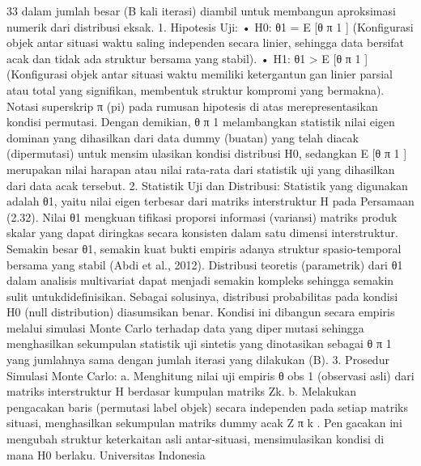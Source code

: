 33
dalam jumlah besar (B kali iterasi) diambil untuk membangun aproksimasi numerik dari
distribusi eksak.
1. Hipotesis Uji:
• H0: θ1 = E [θ
π
1
] (Konfigurasi objek antar situasi waktu saling independen
secara linier, sehingga data bersifat acak dan tidak ada struktur bersama yang
stabil).
• H1: θ1 > E [θ
π
1
] (Konfigurasi objek antar situasi waktu memiliki ketergantungan linier parsial atau total yang signifikan, membentuk struktur kompromi
yang bermakna).
Notasi superskrip π (pi) pada rumusan hipotesis di atas merepresentasikan kondisi
permutasi. Dengan demikian, θ
π
1 melambangkan statistik nilai eigen dominan yang
dihasilkan dari data dummy (buatan) yang telah diacak (dipermutasi) untuk mensimulasikan kondisi distribusi H0, sedangkan E [θ
π
1
] merupakan nilai harapan atau nilai
rata-rata dari statistik uji yang dihasilkan dari data acak tersebut.
2. Statistik Uji dan Distribusi: Statistik yang digunakan adalah θ1, yaitu nilai eigen
terbesar dari matriks interstruktur H pada Persamaan (2.32). Nilai θ1 mengkuantifikasi proporsi informasi (variansi) matriks produk skalar yang dapat diringkas
secara konsisten dalam satu dimensi interstruktur. Semakin besar θ1, semakin kuat
bukti empiris adanya struktur spasio-temporal bersama yang stabil (Abdi et al.,
2012).
Distribusi teoretis (parametrik) dari θ1 dalam analisis multivariat dapat menjadi
semakin kompleks sehingga semakin sulit untukdidefinisikan. Sebagai solusinya,
distribusi probabilitas pada kondisi H0 (null distribution) diasumsikan benar. Kondisi
ini dibangun secara empiris melalui simulasi Monte Carlo terhadap data yang dipermutasi sehingga menghasilkan sekumpulan statistik uji sintetis yang dinotasikan
sebagai θ
π
1 yang jumlahnya sama dengan jumlah iterasi yang dilakukan (B).
3. Prosedur Simulasi Monte Carlo:
a. Menghitung nilai uji empiris θ
obs
1
(observasi asli) dari matriks interstruktur H
berdasar kumpulan matriks Zk.
b. Melakukan pengacakan baris (permutasi label objek) secara independen pada
setiap matriks situasi, menghasilkan sekumpulan matriks dummy acak Z
π
k
. Pengacakan ini mengubah struktur keterkaitan asli antar-situasi, mensimulasikan
kondisi di mana H0 berlaku.
Universitas Indonesia

